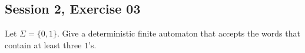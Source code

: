 \subsection{Session 2, Exercise 03}


Let $\Sigma=\{0,1\}$. Give a deterministic finite automaton that accepts the words that contain at least three $1$'s.


